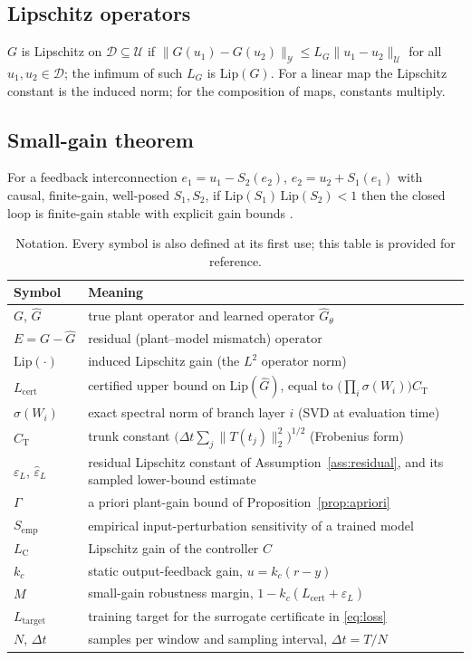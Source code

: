 \documentclass[11pt]{article}
\newcommand{\Ltwo}{L^2}
\newcommand{\Ghat}{\hat{G}}
\newcommand{\Lhat}{L_{\mathrm{cert}}}
\newcommand{\epsL}{\varepsilon_L}
\newcommand{\LC}{L_{\mathrm{C}}}
\newcommand{\Ltarget}{L_{\mathrm{target}}}
\begin{document}
\subsection{Lipschitz operators}
$G$ is Lipschitz on $\mathcal{D}\subseteq\mathcal{U}$ if
$\|G(u_1)-G(u_2)\|_{\mathcal{Y}}\le L_G\|u_1-u_2\|_{\mathcal{U}}$ for all
$u_1,u_2\in\mathcal{D}$; the infimum of such $L_G$ is $\mathrm{Lip}(G)$.
For a linear map the Lipschitz constant is the induced norm; for the
composition of maps, constants multiply.

\subsection{Small-gain theorem}
For a feedback interconnection $e_1=u_1-S_2(e_2)$, $e_2=u_2+S_1(e_1)$ with
causal, finite-gain, well-posed $S_1,S_2$, if $\mathrm{Lip}(S_1)\,
\mathrm{Lip}(S_2)<1$ then the closed loop is finite-gain stable with explicit
gain bounds \citep{desoer1975feedback,khalil2002nonlinear}.

\begin{table}[t]
\centering\small
\caption{Notation. Every symbol is also defined at its first use; this table
is provided for reference.}
\label{tab:notation}
\begin{tabular}{ll}
\toprule
Symbol & Meaning \\
\midrule
$G$, $\Ghat$ & true plant operator and learned operator $\Ghat_\theta$ \\
$E=G-\Ghat$ & residual (plant--model mismatch) operator \\
$\mathrm{Lip}(\cdot)$ & induced Lipschitz gain (the $\Ltwo$ operator norm) \\
$\Lhat$ & certified upper bound on $\mathrm{Lip}(\Ghat)$, equal to
$\big(\prod_i\sigma(W_i)\big)C_{\mathrm{T}}$ \\
$\sigma(W_i)$ & exact spectral norm of branch layer $i$ (SVD at evaluation time) \\
$C_{\mathrm{T}}$ & trunk constant $\big(\Delta t\sum_j\|T(t_j)\|_2^2\big)^{1/2}$ (Frobenius form) \\
$\epsL$, $\hat\epsL$ & residual Lipschitz constant of Assumption~\ref{ass:residual},
and its sampled lower-bound estimate \\
$\Gamma$ & a priori plant-gain bound of Proposition~\ref{prop:apriori} \\
$S_{\mathrm{emp}}$ & empirical input-perturbation sensitivity of a trained model \\
$\LC$ & Lipschitz gain of the controller $C$ \\
$k_c$ & static output-feedback gain, $u=k_c(r-y)$ \\
$M$ & small-gain robustness margin, $1-k_c(\Lhat+\hat\epsL)$ \\
$\Ltarget$ & training target for the surrogate certificate in \eqref{eq:loss} \\
$N$, $\Delta t$ & samples per window and sampling interval, $\Delta t=T/N$ \\
\bottomrule
\end{tabular}
\end{table}
\end{document}
